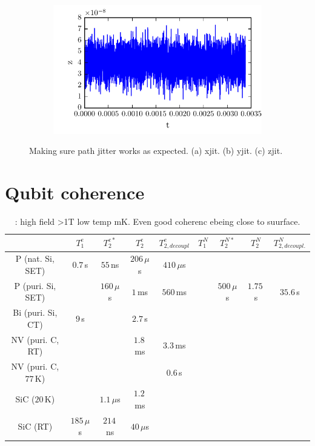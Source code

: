 \begin{figure}[H]
\begin{subfigure}[t]{0.49\textwidth}
		\centering
		\includegraphics[width=\linewidth]{Figures/zjit.pdf}
		\caption{}
		\label{fig:zjit}
	\end{subfigure}
	\label{fig:paritymeas}
	\caption{Making sure path jitter works as expected. (a) xjit. (b) yjit. (c) zjit.}
\end{figure}



\section{Qubit coherence}

\begin{table}
\begin{tabular}{ccccccccc}
	& $T_1^e$ & $T_2^{e*}$ & $T_2^e$ & $T_{2, decoupl}^e$ & $T_1^N$ & $T_2^{N*}$ & $T_2^N$ & $T_{2, decoupl.}^N$\\ \hline
P (nat. Si, SET) \cite{Pla2012}& $0.7\, $s & $55\, $ns  & $206\, \mu$s & $410\, \mu$s &  & & \\
P (puri. Si, SET) \cite{Muhonen2014}&  & $160\, \mu$s  & $1\, $ms & $560\, $ms & & $500\, \mu$s & $1.75\, $s & $35.6\, $s \\
Bi (puri. Si, CT) \cite{Wolfowicz2013} & $9\, $s &  & $2.7\, $s && && &\\
NV (puri. C, RT) \cite{Balasubramanian2009,Bar-Gill2013} & & & $1.8\, $ms & $3.3\, $ms && &&\\
NV (puri. C, $77\, $K) \cite{Bar-Gill2013} & & &  & $0.6\, $s && &&\\
SiC ($20\, $K) \cite{Christle2014} & & $1.1\, \mu$s & $1.2\, $ms & && && \\
SiC (RT) \cite{Koehl2011} & $185\, \mu$s & $214\, $ns & $40\, \mu$s &  & & && \\
\hline
\end{tabular} 
\label{lala}
\caption{\cite{Pla2012,Muhonen2014}: high field >1T low temp mK. Even good coherenc ebeing close to suurface.}
\end{table}

